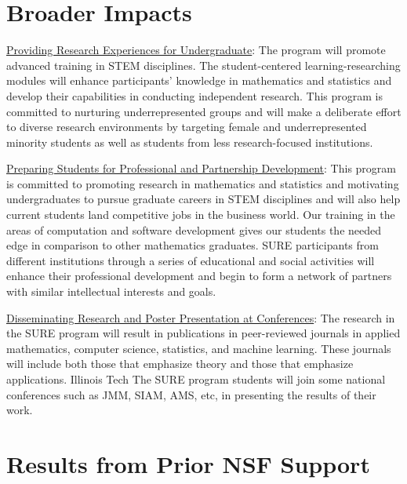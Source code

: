 \documentclass[11pt]{NSFamsart}
\newcommand{\Upara}[1]{\noindent\underline{\upshape #1}:}
\begin{document}
\section{Broader Impacts}
\begin{sloppypar}\Upara{Providing Research Experiences for Undergraduate} 
The program will promote advanced training in STEM
disciplines. The student-centered learning-researching modules will enhance participants’ knowledge in
mathematics and statistics and develop their capabilities in conducting independent research. This program is committed to nurturing underrepresented groups and will make a deliberate effort to diverse research environments by targeting female and underrepresented minority students as well as students from less research-focused institutions. \end{sloppypar}

\Upara{Preparing Students for Professional and Partnership Development} 
 This program is committed to promoting research in mathematics and statistics and motivating undergraduates to pursue graduate careers in STEM disciplines and will also help current students land competitive jobs in the business world. Our training in the areas of computation and software development gives our students the needed edge in comparison to other mathematics graduates. SURE participants from different institutions through a series of educational and social activities will enhance their professional development and begin to form a network of partners with similar intellectual interests and goals. 

\Upara{Disseminating Research and Poster Presentation at Conferences}
The research in the SURE program will result in publications in peer-reviewed journals in applied mathematics, computer science, statistics, and machine learning. These journals will include both those that emphasize theory and those that emphasize applications. Illinois Tech  The SURE program students will join some national conferences such as JMM, SIAM, AMS, etc, in presenting the results of their work.




\section{Results from Prior NSF Support} \label{sec:prior_work}
\end{document}
